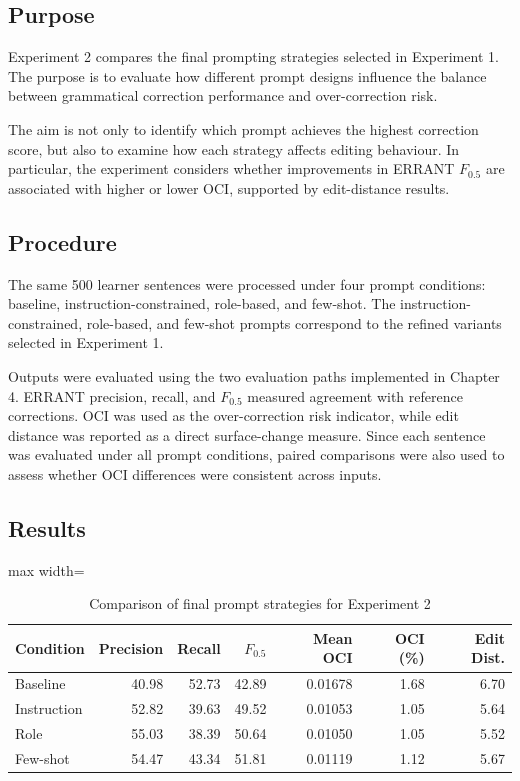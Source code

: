 \subsection{Purpose}

Experiment 2 compares the final prompting strategies selected in Experiment 1. The purpose is to evaluate how different prompt designs influence the balance between grammatical correction performance and over-correction risk.

The aim is not only to identify which prompt achieves the highest correction score, but also to examine how each strategy affects editing behaviour. In particular, the experiment considers whether improvements in ERRANT $F_{0.5}$ are associated with higher or lower OCI, supported by edit-distance results.

\subsection{Procedure}

The same 500 learner sentences were processed under four prompt conditions: baseline, instruction-constrained, role-based, and few-shot. The instruction-constrained, role-based, and few-shot prompts correspond to the refined variants selected in Experiment 1.

Outputs were evaluated using the two evaluation paths implemented in Chapter 4. ERRANT precision, recall, and $F_{0.5}$ measured agreement with reference corrections. OCI was used as the over-correction risk indicator, while edit distance was reported as a direct surface-change measure. Since each sentence was evaluated under all prompt conditions, paired comparisons were also used to assess whether OCI differences were consistent across inputs.

\subsection{Results}

\begin{table}[htbp]
    \centering
    \caption{Comparison of final prompt strategies for Experiment 2}
    \label{tab:exp2_strategy_comparison}
    \renewcommand{\arraystretch}{1.15}
    \begin{adjustbox}{max width=\textwidth}
    \begin{tabular}{lrrrrrr}
        \toprule
        \textbf{Condition} & \textbf{Precision} & \textbf{Recall} & \textbf{$F_{0.5}$} & \textbf{Mean OCI} & \textbf{OCI (\%)} & \textbf{Edit Dist.} \\
        \midrule
        Baseline    & 40.98 & 52.73 & 42.89 & 0.01678 & 1.68 & 6.70 \\
        Instruction & 52.82 & 39.63 & 49.52 & 0.01053 & 1.05 & 5.64 \\
        Role        & 55.03 & 38.39 & 50.64 & 0.01050 & 1.05 & 5.52 \\
        Few-shot    & 54.47 & 43.34 & 51.81 & 0.01119 & 1.12 & 5.67 \\
        \bottomrule
    \end{tabular}
    \end{adjustbox}
\end{table}

